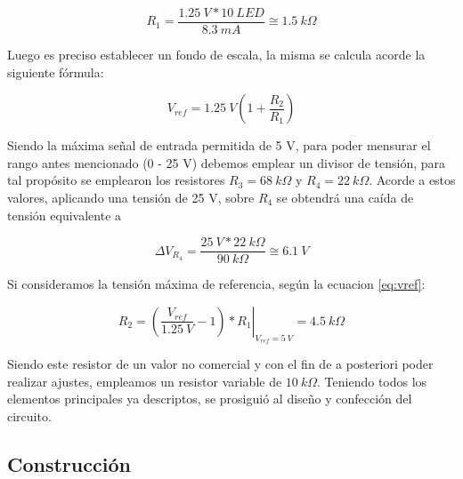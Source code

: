 \documentclass[12pt,a4paper]{article}
\begin{document}
		\begin{equation}
			R_1 = \frac{1.25 \: V * 10 \: LED}{8.3 \: mA} \cong 1.5 \: k \Omega
		\end{equation}

		Luego es preciso establecer un fondo de escala, la misma se calcula acorde la siguiente fórmula:

		\begin{equation}\label{eq:vref}
			V_{ref} = 1.25 \: V (1+\frac{R_2}{R_1})
		\end{equation}

		Siendo la máxima señal de entrada permitida de 5 V, para poder mensurar el rango antes mencionado (0 - 25 V) debemos emplear un divisor de tensión, para tal propósito se emplearon los resistores $R_3 = 68 \: k\Omega$ y $R_4 = 22 \: k\Omega$. Acorde a estos valores, aplicando una tensión de 25 V, sobre $R_4$ se obtendrá una caída de tensión equivalente a

		\begin{equation}
			\Delta V_{R_4} = \frac{25 \: V * 22 \: k\Omega}{90 \: k\Omega} \cong 6.1 \: V
		\end{equation}

		Si consideramos la tensión máxima de referencia, según la ecuacion \ref{eq:vref}:

		\begin{equation}
			\displaystyle R_2 = \left.  \left ( \frac{V_{ref}}{1.25 \: V}-1 \right ) * R_1 \right |_{V_{ref} = 5 \: V} = 4.5 \: k\Omega
		\end{equation}

		Siendo este resistor de un valor no comercial y con el fin de a posteriori poder realizar ajustes, empleamos un resistor variable de $10 \: k\Omega$. Teniendo todos los elementos principales ya descriptos, se prosiguió al diseño y confección del circuito.



		\subsection{Construcción}
\end{document}
